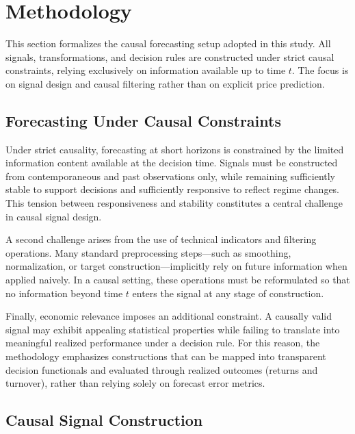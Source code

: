 \documentclass[final,5p,times,twocolumn]{elsarticle}
\begin{document}
\section{Methodology} 

This section formalizes the causal forecasting setup adopted in this study.
All signals, transformations, and decision rules are constructed under strict causal constraints, relying exclusively on information available up to time $t$.
The focus is on signal design and causal filtering rather than on explicit price prediction.

 


\subsection{Forecasting Under Causal Constraints}
\label{subsec:causal_constraints}

Under strict causality, forecasting at short horizons is constrained by the limited information content available at the decision time.
Signals must be constructed from contemporaneous and past observations only, while remaining sufficiently stable to support decisions and sufficiently responsive to reflect regime changes.
This tension between responsiveness and stability constitutes a central challenge in causal signal design.

A second challenge arises from the use of technical indicators and filtering operations.
Many standard preprocessing steps---such as smoothing, normalization, or target construction---implicitly rely on future information when applied naively.
In a causal setting, these operations must be reformulated so that no information beyond time $t$ enters the signal at any stage of construction.

Finally, economic relevance imposes an additional constraint.
A causally valid signal may exhibit appealing statistical properties while failing to translate into meaningful realized performance under a decision rule.
For this reason, the methodology emphasizes constructions that can be mapped into transparent decision functionals and evaluated through realized outcomes (returns and turnover), rather than relying solely on forecast error metrics.

\subsection{Causal Signal Construction}
\label{subsec:causal_signal}
\end{document}
